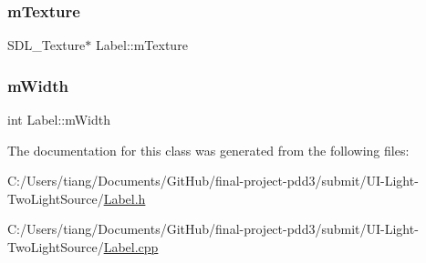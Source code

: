 \subsubsection{\texorpdfstring{m\+Texture}{mTexture}}
{\footnotesize\ttfamily S\+D\+L\+\_\+\+Texture$\ast$ Label\+::m\+Texture\hspace{0.3cm}{\ttfamily [private]}}

\mbox{\label{class_label_a1e3446cc442a467c36ed539a2e4184a0}} 
\subsubsection{\texorpdfstring{m\+Width}{mWidth}}
{\footnotesize\ttfamily int Label\+::m\+Width\hspace{0.3cm}{\ttfamily [private]}}



The documentation for this class was generated from the following files\+:\begin{DoxyCompactItemize}
\item 
C\+:/\+Users/tiang/\+Documents/\+Git\+Hub/final-\/project-\/pdd3/submit/\+U\+I-\/\+Light-\/\+Two\+Light\+Source/\mbox{\hyperlink{_label_8h}{Label.\+h}}\item 
C\+:/\+Users/tiang/\+Documents/\+Git\+Hub/final-\/project-\/pdd3/submit/\+U\+I-\/\+Light-\/\+Two\+Light\+Source/\mbox{\hyperlink{_label_8cpp}{Label.\+cpp}}\end{DoxyCompactItemize}
